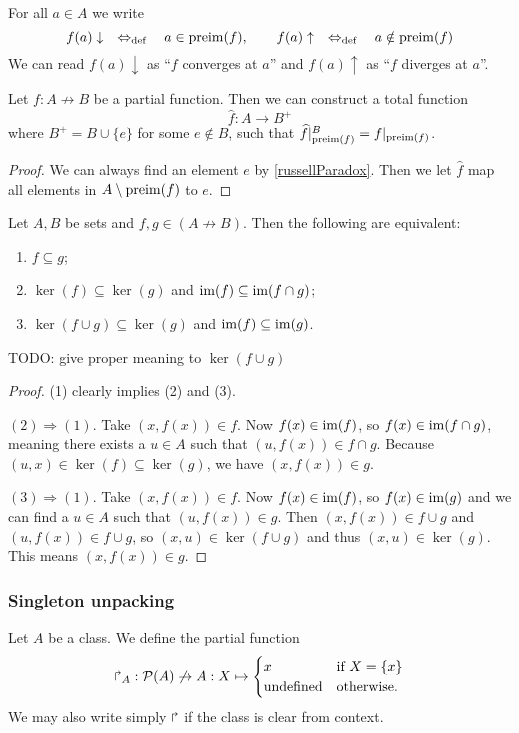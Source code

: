 For all $a\in A$ we write
\[ f(a)\downarrow \quad\Leftrightarrow_{\text{def}}\quad a\in\operatorname{preim}(f),\qquad f(a)\uparrow \quad\Leftrightarrow_{\text{def}}\quad a\notin\operatorname{preim}(f) \]
We can read $f(a)\downarrow$ as ``$f$ converges at $a$'' and $f(a)\uparrow$ as ``$f$ diverges at $a$''.

\begin{lemma} \label{partialFunctionExtension}
Let $f: A \not\to B$ be a partial function. Then we can construct a total function
\[ \widehat{f}: A \to B^+ \]
where $B^+ = B\cup \{e\}$ for some $e\notin B$, such that $\widehat{f}|_{\operatorname{preim}(f)}^B = f|_{\operatorname{preim}(f)}$.
\end{lemma}
\begin{proof}
We can always find an element $e$ by \ref{russellParadox}. Then we let $\widehat{f}$ map all elements in $A\setminus\operatorname{preim}(f)$ to $e$.
\end{proof}

\begin{proposition} \label{partialFunctionSubset}
Let $A,B$ be sets and $f,g\in(A\not\to B)$. Then the following are equivalent:
\begin{enumerate}
\item $f\subseteq g$;
\item $\ker(f) \subseteq \ker(g)$ and $\operatorname{im}(f)\subseteq \operatorname{im}(f\cap g)$;
\item $\ker(f\cup g) \subseteq \ker(g)$ and $\operatorname{im}(f)\subseteq \operatorname{im}(g)$.
\end{enumerate}
TODO: give proper meaning to $\ker(f\cup g)$
\end{proposition}
\begin{proof}
(1) clearly implies (2) and (3).

$(2) \Rightarrow (1)$. Take $(x,f(x)) \in f$. Now $f(x)\in \operatorname{im}(f)$, so $f(x)\in\operatorname{im}(f\cap g)$, meaning there exists a $u\in A$ such that $(u,f(x))\in f\cap g$. Because $(u,x)\in \ker(f)\subseteq \ker(g)$, we have $(x,f(x))\in g$.

$(3) \Rightarrow (1)$. Take $(x,f(x)) \in f$. Now $f(x)\in \operatorname{im}(f)$, so $f(x)\in\operatorname{im}(g)$ and we can find a $u\in A$ such that $(u,f(x))\in g$. Then $(x,f(x)) \in f\cup g$ and $(u,f(x))\in f\cup g$, so $(x,u)\in \ker(f\cup g)$ and thus $(x,u)\in\ker(g)$. This means $(x,f(x))\in g$.
\end{proof}

\subsubsection{Singleton unpacking}
\begin{definition}
Let $A$ be a class. We define the partial function
\[ \operatorname{\Rsh}_A: \operatorname{\mathcal{P}}(A) \not\to A: X \mapsto \begin{cases}
x & \text{if $X = \{x\}$} \\
\text{undefined} & \text{otherwise}.
\end{cases} \]
We may also write simply $\operatorname{\Rsh}$ if the class is clear from context.
\end{definition}

